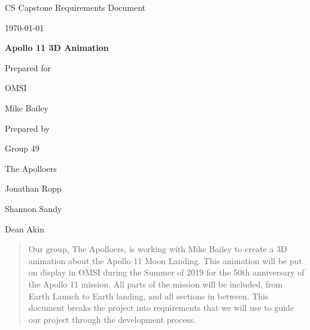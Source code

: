 \documentclass[onecolumn, draftclsnofoot,10pt, compsoc]{IEEEtran}
\def \CapstoneTeamName{		    The Apolloers}
\def \CapstoneTeamNumber{		49}
\def \GroupMemberOne{			Jonathan Ropp}
\def \GroupMemberTwo{			Shannon Sandy}
\def \GroupMemberThree{			Dean Akin}
\def \CapstoneProjectName{		Apollo 11 3D Animation}
\def \CapstoneSponsorCompany{	OMSI}
\def \CapstoneSponsorPerson{	Mike Bailey}
\def \DocType{		
				Requirements Document
				}
\newcommand{\NameSigPair}[1]{\par
\makebox[2.75in][r]{#1} \hfil 	\makebox[3.25in]{\makebox[2.25in]{\hrulefill} \hfill		\makebox[.75in]{\hrulefill}}
\par\vspace{-12pt} \textit{\tiny\noindent
\makebox[2.75in]{} \hfil		\makebox[3.25in]{\makebox[2.25in][r]{Signature} \hfill	\makebox[.75in][r]{Date}}}}
\renewcommand{\NameSigPair}[1]{#1}
\begin{document}
\begin{titlepage}
    \begin{singlespace}
        \hfill 
        \par\vspace{.2in}
        \centering
        \scshape{
            \huge CS Capstone \DocType \par
            {\large\today}\par
            \vspace{.5in}
            \textbf{\Huge\CapstoneProjectName}\par
            \vfill
            {\large Prepared for}\par
            \Huge \CapstoneSponsorCompany\par
            \vspace{5pt}
            {\Large\NameSigPair{\CapstoneSponsorPerson}\par}
            {\large Prepared by }\par
            Group\CapstoneTeamNumber\par
            \CapstoneTeamName\par 
            \vspace{5pt}
            {\Large
                \NameSigPair{\GroupMemberOne}\par
                \NameSigPair{\GroupMemberTwo}\par
                \NameSigPair{\GroupMemberThree}\par
            }
            \vspace{20pt}
        }
        \begin{abstract}
        	Our group, The Apolloers, is working with Mike Bailey to create a 3D animation about the Apollo 11 Moon Landing. This animation will be put on display in OMSI during the Summer of 2019 for the 50th anniversary of the Apollo 11 mission. All parts of the mission will be included, from Earth Launch to Earth landing, and all sections in between. This document breaks the project into requirements that we will use to guide our project through the development process. 
        \end{abstract}     
    \end{singlespace}
\end{titlepage}
\newpage
{}
\tableofcontents
\clearpage
\end{document}
